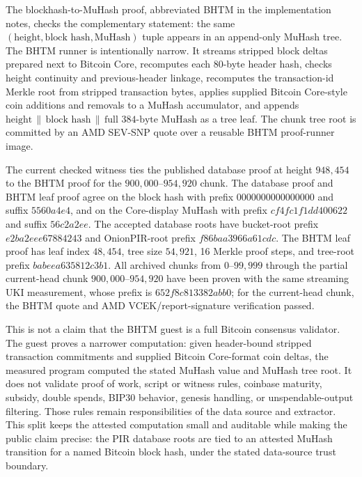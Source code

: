 The blockhash-to-MuHash proof, abbreviated BHTM in the implementation notes, checks the complementary statement: the same \((\text{height}, \text{block hash}, \text{MuHash})\) tuple appears in an append-only MuHash tree. The BHTM runner is intentionally narrow. It streams stripped block deltas prepared next to Bitcoin Core, recomputes each 80-byte header hash, checks height continuity and previous-header linkage, recomputes the transaction-id Merkle root from stripped transaction bytes, applies supplied Bitcoin Core-style coin additions and removals to a MuHash accumulator, and appends \(\text{height} \,\|\, \text{block hash} \,\|\, \text{full 384-byte MuHash}\) as a tree leaf. The chunk tree root is committed by an AMD SEV-SNP quote over a reusable BHTM proof-runner image.

The current checked witness ties the published database proof at height \(948{,}454\) to the BHTM proof for the \(900{,}000\)--\(954{,}920\) chunk. The database proof and BHTM leaf proof agree on the block hash with prefix \(0000000000000000\) and suffix \(5560a4e4\), and on the Core-display MuHash with prefix \(cf4fc1f1dd400622\) and suffix \(56c2a2ee\). The accepted database roots have bucket-root prefix \(e2ba2eee67884243\) and OnionPIR-root prefix \(f86baa3966a61cdc\). The BHTM leaf proof has leaf index \(48{,}454\), tree size \(54{,}921\), 16 Merkle proof steps, and tree-root prefix \(babeea635812c3b1\). All archived chunks from \(0\)--\(99{,}999\) through the partial current-head chunk \(900{,}000\)--\(954{,}920\) have been proven with the same streaming UKI measurement, whose prefix is \(652f8c813382abb0\); for the current-head chunk, the BHTM quote and AMD VCEK/report-signature verification passed.

This is not a claim that the BHTM guest is a full Bitcoin consensus validator. The guest proves a narrower computation: given header-bound stripped transaction commitments and supplied Bitcoin Core-format coin deltas, the measured program computed the stated MuHash value and MuHash tree root. It does not validate proof of work, script or witness rules, coinbase maturity, subsidy, double spends, BIP30 behavior, genesis handling, or unspendable-output filtering. Those rules remain responsibilities of the data source and extractor. This split keeps the attested computation small and auditable while making the public claim precise: the PIR database roots are tied to an attested MuHash transition for a named Bitcoin block hash, under the stated data-source trust boundary.

